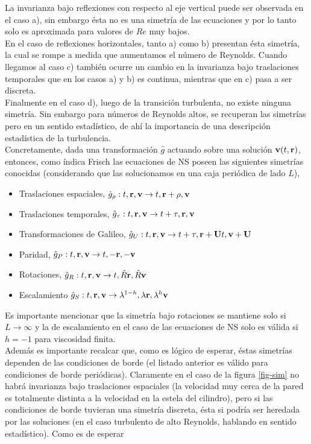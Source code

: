 \documentclass[executivepaper,12pt]{article}
\numberwithin{equation}{section}
\begin{document}
La invarianza bajo reflexiones con respecto al eje vertical puede ser observada en el caso a), sin embargo ésta no es una simetría de las ecuaciones y por lo tanto solo es aproximada para valores de $Re$ muy bajos. \\
En el caso de reflexiones horizontales, tanto a) como b) presentan ésta simetría, la cual se rompe a medida que aumentamos el número de Reynolds. Cuando llegamos al caso c) también ocurre un cambio en la invarianza bajo traslaciones temporales que en los casos a) y b) es continua, mientras que en c) pasa a ser discreta. \\
Finalmente en el caso d), luego de la transición turbulenta, no existe ninguna simetría. Sin embargo para números de Reynolds altos, se recuperan las simetrías pero en un sentido estadístico, de ahí la importancia de una descripción estadística de la turbulencia. \\
Concretamente, dada una transformación $\hat{g}$ actuando sobre una solución $\vb{v}(t,\vb{r})$, entonces, como índica Frisch \parencite{frisch1995} las ecuaciones de NS poseen las siguientes simetrías conocidas (considerando que las solucionamos en una caja periódica de lado $L$),
\begin{itemize}
	\item Traslaciones espaciales, $\hat{g}_{\rho}:t,\vb{r},\vb{v}\to t,\vb{r}+\vb{\rho},\vb{v}$ 
	\item Traslaciones temporales, $\hat{g}_{\tau}:t,\vb{r},\vb{v}\to t+\tau,\vb{r},\vb{v}$ 
	\item Transformaciones de Galileo, $\hat{g}_{U}:t,\vb{r},\vb{v}\to t+\tau,\vb{r}+\vb{U}t,\vb{v}+\vb{U}$
	\item Paridad, $\hat{g}_{P}:t,\vb{r},\vb{v}\to t,-\vb{r},-\vb{v}$
	\item Rotaciones, $\hat{g}_{R}:t,\vb{r},\vb{v}\to t,\hat{R}\vb{r},\hat{R}\vb{v}$  
	\item Escalamiento $\hat{g}_{S}:t,\vb{r},\vb{v}\to \lambda^{1-h},\lambda\vb{r},\lambda^{h}\vb{v}$  
\end{itemize} 

Es importante mencionar que la simetría bajo rotaciones se mantiene solo si $L\to \infty$ y la de escalamiento en el caso de las ecuaciones de NS solo es válida si $h=-1$ para viscosidad finita. \\
Además es importante recalcar que, como es lógico de esperar, éstas simetrías dependen de las condiciones de borde (el listado anterior es válido para condiciones de borde periódicas). Claramente en el caso de la figura \ref{fig-sim} no habrá invarianza bajo traslaciones espaciales (la velocidad muy cerca de la pared es totalmente distinta a la velocidad en la estela del cilindro), pero si las condiciones de borde tuvieran una simetría discreta, ésta si podría ser heredada por las soluciones (en el caso turbulento de alto Reynolds, hablando en sentido estadístico). Como es de esperar
\end{document}
